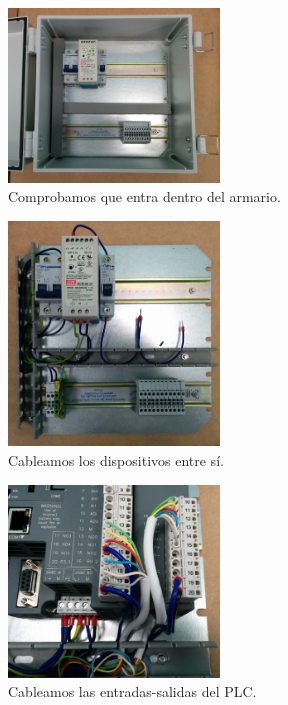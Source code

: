     \begin{figure}[H]
            \centering
            \includegraphics[width=0.5\textwidth]{images/cuadro/IMG_20150313_143943.jpg}
            \caption{Comprobamos que entra dentro del armario.}
            \label{fig:cuad_montaje3}
    \end{figure}
    \begin{figure}[H]
            \centering
            \includegraphics[width=0.5\textwidth]{images/cuadro/IMG_20150313_182301.jpg}
            \caption{Cableamos los dispositivos entre sí.}
            \label{fig:cuad_montaje4}
    \end{figure}
       \begin{figure}[H]
            \centering
            \includegraphics[width=0.5\textwidth]{images/cuadro/IMG_20150331_113600.jpg}
            \caption{Cableamos las entradas-salidas del PLC.}
            \label{fig:cuad_montaje5}
    \end{figure}
